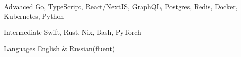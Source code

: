 
\begin{cvskills}

  \cvskill
    {Advanced}
    {Go, TypeScript, React/NextJS, GraphQL, Postgres, Redis, Docker, Kubernetes, Python}

    \cvskill
    {Intermediate}
    {Swift, Rust, Nix, Bash, PyTorch}

  \cvskill
    {Languages}
    {English \& Russian(fluent)}

\end{cvskills}
